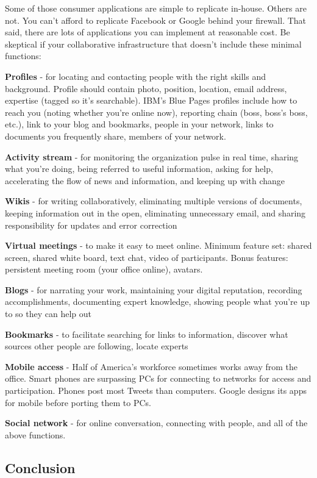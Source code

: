 Some of those consumer applications are simple to replicate in-house.
Others are not. You can't afford to replicate Facebook or Google behind
your firewall. That said, there are lots of applications you can
implement at reasonable cost. Be skeptical if your collaborative
infrastructure that doesn't include these minimal functions:

\textbf{Profiles} - for locating and contacting people with the right
skills and background. Profile should contain photo, position, location,
email address, expertise (tagged so it's searchable). IBM's Blue Pages
profiles include how to reach you (noting whether you're online now),
reporting chain (boss, boss's boss, etc.), link to your blog and
bookmarks, people in your network, links to documents you frequently
share, members of your network.

\textbf{Activity stream} - for monitoring the organization pulse in real
time, sharing what you're doing, being referred to useful information,
asking for help, accelerating the flow of news and information, and
keeping up with change

\textbf{Wikis} - for writing collaboratively, eliminating multiple
versions of documents, keeping information out in the open, eliminating
unnecessary email, and sharing responsibility for updates and error
correction

\textbf{Virtual meetings} - to make it easy to meet online. Minimum
feature set: shared screen, shared white board, text chat, video of
participants. Bonus features: persistent meeting room (your office
online), avatars.

\textbf{Blogs} - for narrating your work, maintaining your digital
reputation, recording accomplishments, documenting expert knowledge,
showing people what you're up to so they can help out

\textbf{Bookmarks} - to facilitate searching for links to information,
discover what sources other people are following, locate experts

\textbf{Mobile access} - Half of America's workforce sometimes works
away from the office. Smart phones are surpassing PCs for connecting to
networks for access and participation. Phones post most Tweets than
computers. Google designs its apps for mobile before porting them to
PCs.

\textbf{Social network} - for online conversation, connecting with
people, and all of the above functions.

\subsection{Conclusion}\label{workscape-conclusion}

